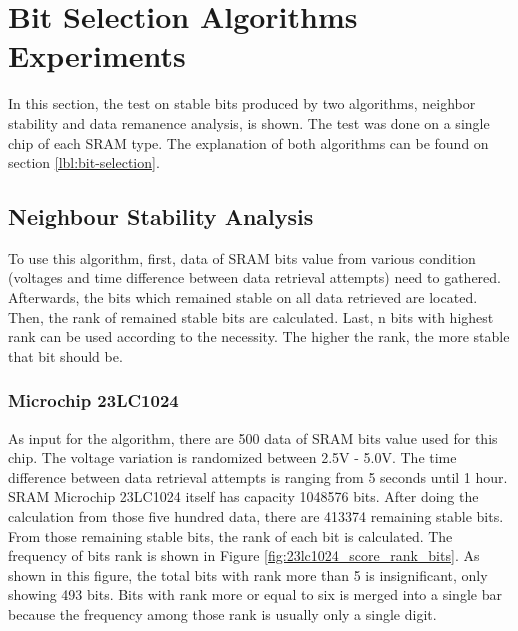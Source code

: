 \section{Bit Selection Algorithms Experiments}

In this section, the test on stable bits produced by two algorithms, neighbor stability and data remanence analysis, is shown. The test was done on a single chip of each SRAM type.
The explanation of both algorithms can be found on section \ref{lbl:bit-selection}.

\subsection{Neighbour Stability Analysis}
To use this algorithm, first, data of SRAM bits value from various condition (voltages and time difference between data retrieval attempts) need to gathered. Afterwards, the bits which remained stable on all data retrieved are located. Then, the rank of remained stable bits are calculated. Last, n bits with highest rank can be used according to the necessity. The higher the rank, the more stable that bit should be.

\subsubsection{Microchip 23LC1024}
As input for the algorithm, there are 500 data of SRAM bits value used for this chip. The voltage variation is randomized between 2.5V - 5.0V. The time difference between data retrieval attempts is ranging from 5 seconds until 1 hour.
SRAM Microchip 23LC1024 itself has capacity 1048576 bits. After doing the calculation from those five hundred data, there are 413374 remaining stable bits. From those remaining stable bits, the rank of each bit is calculated. The frequency of bits rank is shown in Figure \ref{fig:23lc1024_score_rank_bits}. As shown in this figure, the total bits with rank more than 5 is insignificant, only showing 493 bits. Bits with rank more or equal to six is merged into a single bar because the frequency among those rank is usually only a single digit.

